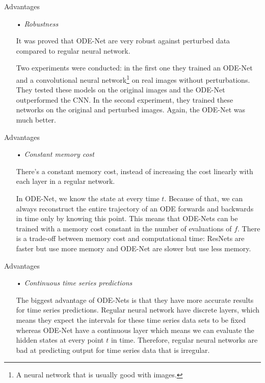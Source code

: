 \documentclass[11pt]{beamer}
\begin{document}
\begin{frame}{Advantages}
\begin{itemize}
\item[•] \textit{Robustness} \cite{4}

It was proved that ODE-Net are very robust against perturbed data compared to regular neural network. 

Two experiments were conducted: in the first one they trained an ODE-Net and a convolutional neural network\footnote{A neural network that is usually good with images.} on real images without perturbations. They tested these models on the original images and the ODE-Net outperformed the CNN. In the second experiment, they trained these networks on the original and perturbed images. Again, the ODE-Net was much better.
\end{itemize}
\end{frame}

\begin{frame}{Advantages}
\begin{itemize}
\item[•] \textit{Constant memory cost}

There's a constant memory cost, instead of increasing the cost linearly with each layer in a regular network. 

In ODE-Net, we know the state at every time $t$. Because of that, we can always reconstruct the entire trajectory of an ODE forwards and backwards in time only by knowing this point. This means that ODE-Nets can be trained with a memory cost constant in the number of evaluations of $f$.
There is a trade-off between memory cost and computational time: ResNets are faster but use more memory and ODE-Net are slower but use less memory.
\end{itemize}
\end{frame}

\begin{frame}{Advantages}
\begin{itemize}
\item[•] \textit{Continuous time series predictions}

The biggest advantage of ODE-Nets is that they have more accurate results for time series predictions. Regular neural network have discrete layers, which means they expect the intervals for these time series data sets to be fixed whereas ODE-Net have a continuous layer which means we can evaluate the hidden states at every point $t$ in time. Therefore, regular neural networks are bad at predicting output for time series data that is irregular.
\end{itemize}
\end{frame}
\end{document}
